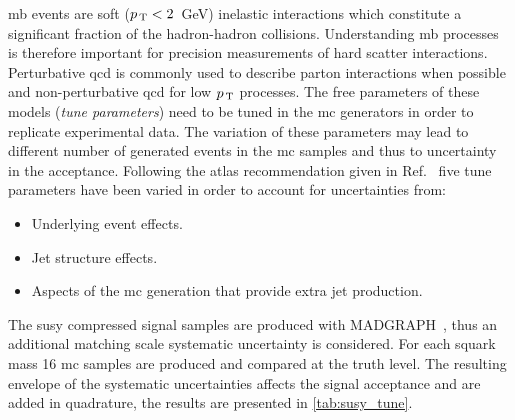 \gls{mb} events are soft ($p_\mathrm{\, T} < 2$~GeV) inelastic interactions which constitute
a significant fraction of the hadron-hadron collisions. Understanding \gls{mb}
processes is therefore important for precision measurements of hard scatter
interactions. Perturbative \gls{qcd} is commonly used to describe parton
interactions when possible and non-perturbative \gls{qcd} for low $p_\mathrm{\, T}$
processes. The free parameters of these models (\emph{tune parameters}) need to
be tuned in the \gls{mc} generators in order to replicate experimental data. The
variation of these parameters may lead to different number of generated events
in the \gls{mc} samples and thus to uncertainty in the acceptance. Following the
\gls{atlas} recommendation given in Ref.~\cite{MCTuningRecommendations2015} five
tune parameters have been varied in order to account for uncertainties from:
\begin{itemize}
\item Underlying event effects.
\item Jet structure effects.
\item Aspects of the \gls{mc} generation that provide extra jet production.
\end{itemize}
The \gls{susy} compressed signal samples are produced with
MADGRAPH~\cite{MADGRAPH}, thus an additional matching scale systematic
uncertainty is considered.%
For each squark mass 16 \gls{mc} samples are produced and compared at the truth
level. The resulting envelope of the systematic uncertainties affects the signal
acceptance and are added in quadrature, the results are presented in
\cref{tab:susy_tune}.
\begin{table}[!h]
  \centering
\caption{Theoretical uncertainty in \% on the \gls{susy} compressed spectra
  signal region acceptance as function of the $\met$ bin in the signal region,
  from tune, matching, initial and final state radiation systematic
  uncertainties. The final value is a common envelope valid for all the
  \gls{susy} compressed models.}
  \label{tab:susy_tune}
\end{table}

